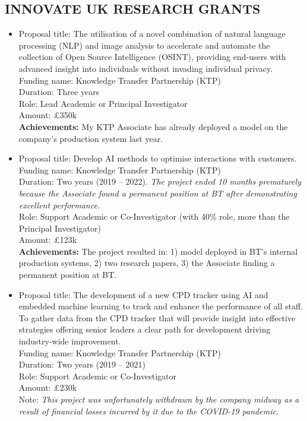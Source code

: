 \documentclass[margin]{res}
\begin{document}
\begin{resume}
\section{INNOVATE UK RESEARCH GRANTS}
\begin{itemize}
    \item Proposal title: The utilisation of a novel combination of natural language processing (NLP) and image analysis to accelerate and automate the collection of Open Source Intelligence (OSINT), providing end-users with advanced insight into individuals without invading individual privacy.\\
Funding name: Knowledge Transfer Partnership (KTP)\\
Duration: Three years\\
Role: Lead Academic or Principal Investigator\\
Amount: \pounds350k \\
\textbf{Achievements:} My KTP Associate has already deployed a model on the company's production system last year.

    \item Proposal title: Develop AI methods to optimise interactions with customers. \\
    Funding name: Knowledge Transfer Partnership (KTP)\\
    Duration: Two years (2019 -- 2022). \textit{The project ended 10 months prematurely because the Associate found a permanent position at BT after demonstrating excellent performance.} \\
    Role: Support Academic or Co-Investigator (with 40\% role, more than the Principal Investigator) \\
    Amount: \pounds123k \\
    \textbf{Achievements:} The project resulted in: 1) model deployed in BT's internal production systems, 2) two research papers, 3) the Associate finding a permanent position at BT.

    \item Proposal title: The development of a new CPD tracker using AI and embedded machine learning to track and enhance the performance of all
staff. To gather data from the CPD tracker that will provide insight into effective strategies offering senior leaders a clear path for development driving industry-wide improvement. \\
    Funding name: Knowledge Transfer Partnership (KTP)\\
    Duration: Two years (2019 -- 2021) \\
    Role: Support Academic or Co-Investigator \\
    Amount: \pounds230k \\
    Note: \textit{This project was unfortunately withdrawn by the company midway as a result of financial losses incurred by it due to the COVID-19 pandemic.}
    

\end{itemize}
\end{resume}
\end{document}
